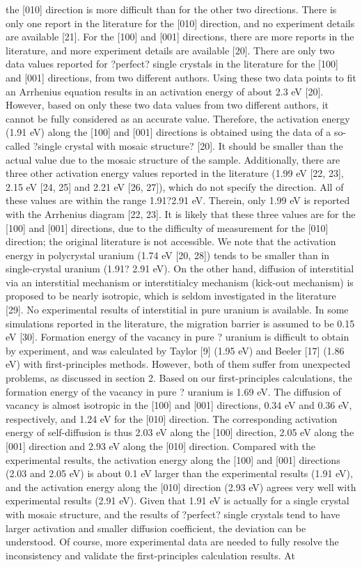 \documentclass[review]{elsarticle}
\begin{document}
the [010] direction is more difficult than for the other two directions. There is only one report in the literature for the [010] direction, and no experiment details are available [21]. For the [100] and [001] directions, there are more reports in the literature, and more experiment details are available [20]. There are only two data values reported for ?perfect? single crystals in the literature for the [100] and [001] directions, from two different authors. Using these two data points to fit an Arrhenius equation results in an activation energy of about 2.3 eV [20]. However, based on only these two data values from two different authors, it cannot be fully considered as an accurate value. Therefore, the activation energy (1.91 eV) along the [100] and [001] directions is obtained using the data of a so-called ?single crystal with mosaic structure? [20]. It should be smaller than the actual value due to the mosaic structure of the sample. Additionally, there are three other activation energy values reported in the literature (1.99 eV [22, 23], 2.15 eV [24, 25] and 2.21 eV [26, 27]), which do not specify the direction. All of these values are within the range 1.91?2.91 eV. Therein, only 1.99 eV is reported with the Arrhenius diagram [22, 23].  It is likely that these three values are for the [100] and [001] directions, due to the difficulty of measurement for the [010] direction; the original literature is not accessible. We note that the activation energy in polycrystal uranium (1.74 eV [20, 28]) tends to be smaller than in single-crystal uranium (1.91? 2.91 eV). On the other hand, diffusion of interstitial via an interstitial mechanism or interstitialcy mechanism (kick-out mechanism) is proposed to be nearly isotropic, which is seldom investigated in the literature [29].  No experimental results of interstitial in pure uranium is available. In some simulations reported in the literature, the migration barrier is assumed to be 0.15 eV [30]. Formation energy of the vacancy in pure ? uranium is difficult to obtain by experiment, and was calculated by Taylor [9] (1.95 eV) and Beeler [17] (1.86 eV) with first-principles methods. However, both of them suffer from unexpected problems, as discussed in section 2.  Based on our first-principles calculations, the formation energy of the vacancy in pure ? uranium is 1.69 eV. The diffusion of vacancy is almost isotropic in the [100] and [001] directions, 0.34 eV and 0.36 eV, respectively, and 1.24 eV for the [010] direction. The corresponding activation energy of self-diffusion is thus 2.03 eV along the [100] direction, 2.05 eV along the [001] direction and 2.93 eV along the [010] direction.  Compared with the experimental results, the activation energy along the [100] and [001] directions (2.03 and 2.05 eV) is about 0.1 eV larger than the experimental results (1.91 eV), and the activation energy along the [010] direction (2.93 eV) agrees very well with experimental results (2.91 eV). Given that 1.91 eV is actually for a single crystal with mosaic structure, and the results of ?perfect? single crystals tend to have larger activation and smaller diffusion coefficient, the deviation can be understood. Of course, more experimental data are needed to fully resolve the inconsistency and validate the first-principles calculation results.  At 
\end{document}
